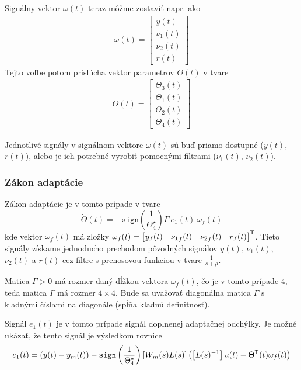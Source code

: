 \documentclass[a4paper, 10pt, ]{article}
\begin{document}
Signálny vektor $\omega(t)$ teraz môžme zostaviť napr. ako
\begin{align}
    \omega(t) =
    \begin{bmatrix}
        y(t) \\ \nu_1(t) \\ \nu_2(t) \\ r(t)
    \end{bmatrix}
\end{align}
Tejto voľbe potom prislúcha vektor parametrov $\Theta(t)$ v tvare
\begin{align}
    \Theta(t) =
    \begin{bmatrix}
        \Theta_3(t) \\ \Theta_1(t) \\ \Theta_2(t) \\ \Theta_4(t)
    \end{bmatrix}
\end{align}

Jednotlivé signály v signálnom vektore $\omega(t)$ sú buď priamo dostupné ($y(t)$, $r(t)$), alebo je ich potrebné vyrobiť pomocnými filtrami ($\nu_1(t)$, $\nu_2(t)$).








\subsubsection{Zákon adaptácie}


Zákon adaptácie je v tomto prípade v tvare
\begin{equation}
	\dot \Theta(t) = - \texttt{sign}\left(\frac{1}{\Theta_4^\star}\right) \Gamma \ e_1(t) \  \omega_f(t)
\end{equation}
kde vektor $\omega_f(t)$ má zložky $\omega_f(t) = \begin{bmatrix} y_f(t) & {\nu_1}_f(t) & {\nu_2}_f(t) & r_f(t) \end{bmatrix}^{\mathsf{T}}$. Tieto signály získame jednoducho prechodom pôvodných signálov $y(t)$, $\nu_1(t)$, $\nu_2(t)$ a $r(t)$ cez filtre s prenosovou funkciou v tvare $\frac{1}{s+\rho}$.

Matica $\Gamma > 0$ má rozmer daný dĺžkou vektora $\omega_f(t)$, čo je v tomto prípade 4, teda matica $\Gamma$ má rozmer $4 \times 4$. Bude sa uvažovať diagonálna matica $\Gamma$ s kladnými číslami na diagonále (spĺňa kladnú definitnosť).

Signál $e_1(t)$ je v tomto prípade signál doplnenej adaptačnej odchýlky. Je možné ukázať, že tento signál je výsledkom rovnice
\begin{equation} \label{rovdopadaptodch}
	e_1(t) = \left(y(t) - y_m(t)\right) - \texttt{sign}\left(\frac{1}{\Theta_4^\star}\right) \left[ W_m(s) L(s) \right]  \left( \left[L(s)^{-1}\right] u(t) - \Theta^{\mathsf{T}}(t) \omega_f(t) \right)
\end{equation}
\end{document}
